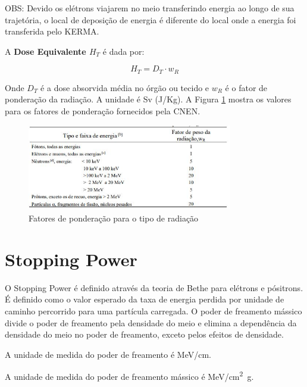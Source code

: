 \documentclass[11pt,a4paper]{article}
\newcounter{exemplo}
\begin{document}
		\textcolor{CarnationPink}{OBS:} Devido os elétrons viajarem no meio transferindo energia ao longo de sua trajetória, o local de deposição de energia é diferente do local onde a energia foi transferida pelo KERMA. 

		A \textbf{\textcolor{CarnationPink}{Dose Equivalente $H_T$}} é dada por:

		\begin{equation}
			H_T = D_T \cdot w_R
		\end{equation}

		Onde $D_T$ é a dose absorvida média no órgão ou tecido e $w_R$ é o fator de ponderação da radiação. A unidade é Sv (J/Kg). A Figura \ref{fig:fatorPesoRadiacao} mostra os valores para os fatores de ponderação fornecidos pela CNEN.

		\begin{figure}[h]
			\centering
			\includegraphics[width=0.8\textwidth]{Imagens/fatorPesoRadiacao.JPG}
			\caption{Fatores de ponderação para o tipo de radiação}
			\label{fig:fatorPesoRadiacao}
		\end{figure}


	\section{Stopping Power}

		O Stopping Power é definido através da teoria de Bethe para elétrons e pósitrons. É definido como o valor esperado da taxa de energia perdida por unidade de caminho percorrido para uma partícula carregada. O poder de freamento mássico divide o poder de freamento pela densidade do meio e elimina a dependência da densidade do meio no poder de freamento, exceto pelos efeitos de densidade. 

			\begin{exemplo}[Unidade]

				A unidade de medida do poder de freamento é \unit{MeV/cm}.

				A unidade de medida do poder de freamento mássico é \unit{MeV/cm^2g}.

			\end{exemplo}
\end{document}
